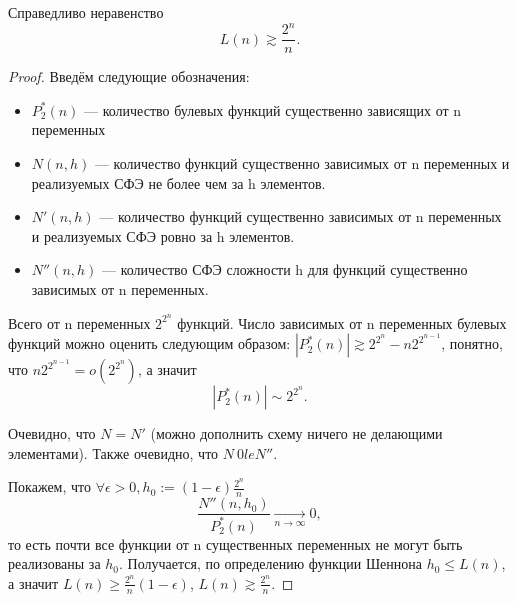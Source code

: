 \begin{theorem}
	Справедливо неравенство \[
		L(n) \gtrsim \frac{2^n}{n}
	.\] 
\end{theorem}
\begin{proof}
Введём следующие обозначения:
\begin{itemize}
	\item $P_2^*(n)$ --- количество булевых функций существенно зависящих от n
		переменных
	\item $N(n, h)$ --- количество функций существенно зависимых от n
		переменных и реализуемых СФЭ не более чем за h элементов.
	\item $N'(n, h)$ --- количество функций существенно зависимых от n
		переменных и реализуемых СФЭ ровно за h элементов.
	\item $N''(n, h)$ --- количество СФЭ сложности h для функций существенно
		зависимых от n переменных.
\end{itemize}
Всего от n переменных $2^{2^n}$ функций. Число зависимых от n переменных булевых
функций можно оценить следующим образом: $|P_2^*(n)| \gtrsim 2^{2^n} - n
2^{2^{n-1}}$, понятно, что $n 2^{2^{n-1}} = o(2^{2^n})$, а значит \[|P_2^*(n)|
\sim 2^{2^n}.\] 

Очевидно, что $N = N'$ (можно дополнить схему ничего не делающими элементами).
Также очевидно, что $N \ 0le N''$. 

Покажем, что  $\forall \epsilon >0, h_0:=\left( 1-\epsilon \right) \frac{2^n}{n}$  \[
	\frac{N''(n,h_0)}{P_2^*(n)} \to\limits_{n \to \infty} 0
,\] то есть почти все функции от n существенных переменных не могут быть
реализованы за $h_0$. Получается, по определению функции Шеннона $h_0 \le L(n)$,
а значит $L(n) \ge \frac{2^n}{n}\left( 1-\epsilon \right) $, $L(n)\gtrsim
\frac{2^n}{n}$.


\end{proof}
